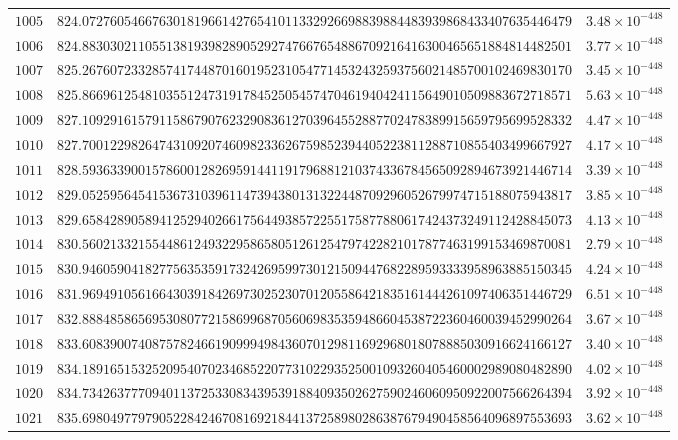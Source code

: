 \documentclass[12pt,reqno]{amsart}
\theoremstyle{remark}
\begin{document}
\begin{longtable}{clc}
$1005$ & $824.0727605466763018196614276541011332926698839884483939868433407635446479$ & $3.48\times 10^{-448}$ \\
$1006$ & $824.8830302110551381939828905292747667654886709216416300465651884814482501$ & $3.77\times 10^{-448}$ \\
$1007$ & $825.2676072332857417448701601952310547714532432593756021485700102469830170$ & $3.45\times 10^{-448}$ \\
$1008$ & $825.8669612548103551247319178452505457470461940424115649010509883672718571$ & $5.63\times 10^{-448}$ \\
$1009$ & $827.1092916157911586790762329083612703964552887702478389915659795699528332$ & $4.47\times 10^{-448}$ \\
$1010$ & $827.7001229826474310920746098233626759852394405223811288710855403499667927$ & $4.17\times 10^{-448}$ \\
$1011$ & $828.5936339001578600128269591441191796881210374336784565092894673921446714$ & $3.39\times 10^{-448}$ \\
$1012$ & $829.0525956454153673103961147394380131322448709296052679974715188075943817$ & $3.85\times 10^{-448}$ \\
$1013$ & $829.6584289058941252940266175644938572255175877880617424373249112428845073$ & $4.13\times 10^{-448}$ \\
$1014$ & $830.5602133215544861249322958658051261254797422821017877463199153469870081$ & $2.79\times 10^{-448}$ \\
$1015$ & $830.9460590418277563535917324269599730121509447682289593333958963885150345$ & $4.24\times 10^{-448}$ \\
$1016$ & $831.9694910561664303918426973025230701205586421835161444261097406351446729$ & $6.51\times 10^{-448}$ \\
$1017$ & $832.8884858656953080772158699687056069835359486604538722360460039452990264$ & $3.67\times 10^{-448}$ \\
$1018$ & $833.6083900740875782466190999498436070129811692968018078885030916624166127$ & $3.40\times 10^{-448}$ \\
$1019$ & $834.1891651532520954070234685220773102293525001093260405460002989080482890$ & $4.02\times 10^{-448}$ \\
$1020$ & $834.7342637770940113725330834395391884093502627590246060950922007566264394$ & $3.92\times 10^{-448}$ \\
$1021$ & $835.6980497797905228424670816921844137258980286387679490458564096897553693$ & $3.62\times 10^{-448}$ \\

\end{longtable}
\end{document}
